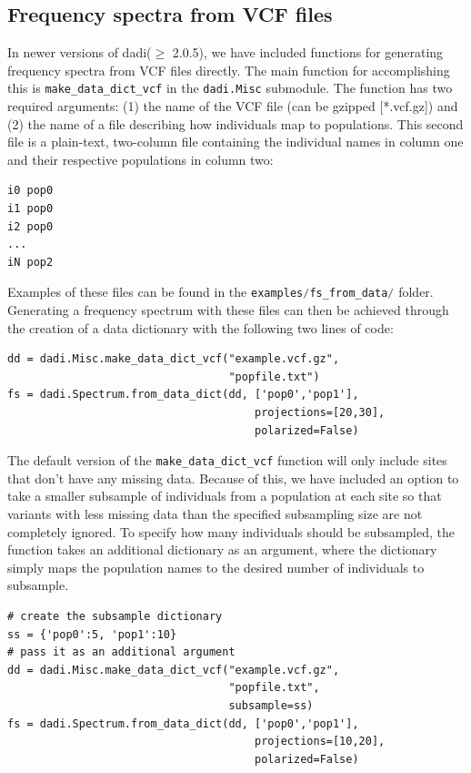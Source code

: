 \documentclass[12pt]{article}
\makeatletter
\newcommand{\dadi}{dadi\xspace}
\newcommand{\py}[1]{\lstinline[language=Python, showstringspaces=False]@#1@}
\makeatother
\begin{document}
\subsection{Frequency spectra from VCF files}\label{fs:vcf}

In newer versions of \dadi ($\geq$ 2.0.5), we have included functions for generating frequency spectra from VCF files directly.
The main function for accomplishing this is \py{make_data_dict_vcf} in the \py{dadi.Misc} submodule.
The function has two required arguments: (1) the name of the VCF file (can be gzipped [*.vcf.gz]) and
(2) the name of a file describing how individuals map to populations. This second file is a plain-text, two-column
file containing the individual names in column one and their respective populations in column two:
\smallskip

\begin{lstlisting}
i0 pop0
i1 pop0
i2 pop0
...
iN pop2
\end{lstlisting}
\smallskip

\noindent Examples of these files can be found in the \py{examples/fs_from_data/} folder.
Generating a frequency spectrum with these files can then be achieved through the creation of
a data dictionary with the following two lines of code:
\smallskip

\begin{lstlisting}
dd = dadi.Misc.make_data_dict_vcf("example.vcf.gz",
                                  "popfile.txt")
fs = dadi.Spectrum.from_data_dict(dd, ['pop0','pop1'],
                                      projections=[20,30],
                                      polarized=False)
\end{lstlisting}
\smallskip

The default version of the \py{make_data_dict_vcf} function will only include sites
that don't have any missing data. Because of this, we have included an option to take
a smaller subsample of individuals from a population at each site so that variants
with less missing data than the specified subsampling size are not completely ignored.
To specify how many individuals should be subsampled, the function takes an additional
dictionary as an argument, where the dictionary simply maps the population names to the
desired number of individuals to subsample.
\smallskip

\begin{lstlisting}
# create the subsample dictionary
ss = {'pop0':5, 'pop1':10}
# pass it as an additional argument
dd = dadi.Misc.make_data_dict_vcf("example.vcf.gz",
                                  "popfile.txt",
                                  subsample=ss)
fs = dadi.Spectrum.from_data_dict(dd, ['pop0','pop1'],
                                      projections=[10,20],
                                      polarized=False)
\end{lstlisting}
\smallskip
\end{document}
